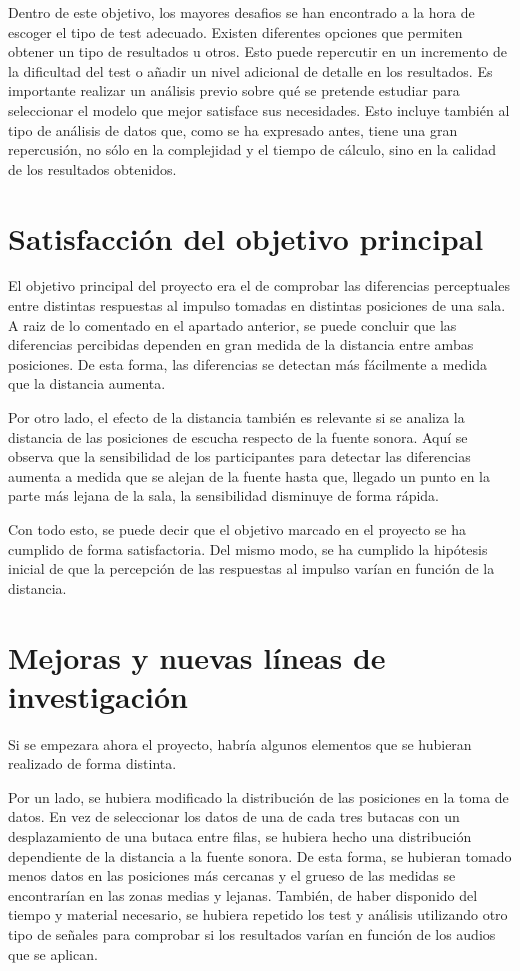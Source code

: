\documentclass[11pt,a4paper,twoside]{book}
\begin{document}
            Dentro de este objetivo, los mayores desafios se han encontrado a la hora de escoger el tipo de test adecuado. Existen diferentes opciones que permiten obtener un tipo de resultados u otros. Esto puede repercutir en un incremento de la dificultad del test o añadir un nivel adicional de detalle en los resultados. Es importante realizar un análisis previo sobre qué se pretende estudiar para seleccionar el modelo que mejor satisface sus necesidades. Esto incluye también al tipo de análisis de datos que, como se ha expresado antes, tiene una gran repercusión, no sólo en la complejidad y el tiempo de cálculo, sino en la calidad de los resultados obtenidos.
    
    \section{Satisfacción del objetivo principal}
        El objetivo principal del proyecto era el de comprobar las diferencias perceptuales entre distintas respuestas al impulso tomadas en distintas posiciones de una sala. A raiz de lo comentado en el apartado anterior, se puede concluir que las diferencias percibidas dependen en gran medida de la distancia entre ambas posiciones. De esta forma, las diferencias se detectan más fácilmente a medida que la distancia aumenta.
        
        Por otro lado, el efecto de la distancia también es relevante si se analiza la distancia de las posiciones de escucha respecto de la fuente sonora. Aquí se observa que la sensibilidad de los participantes para detectar las diferencias aumenta a medida que se alejan de la fuente hasta que, llegado un punto en la parte más lejana de la sala, la sensibilidad disminuye de forma rápida.
        
        Con todo esto, se puede decir que el objetivo marcado en el proyecto se ha cumplido de forma satisfactoria. Del mismo modo, se ha cumplido la hipótesis inicial de que la percepción de las respuestas al impulso varían en función de la distancia.
    
    \section{Mejoras y nuevas líneas de investigación}
    
        Si se empezara ahora el proyecto, habría algunos elementos que se hubieran realizado de forma distinta.
        
        Por un lado, se hubiera modificado la distribución de las posiciones en la toma de datos. En vez de seleccionar los datos de una de cada tres butacas con un desplazamiento de una butaca entre filas, se hubiera hecho una distribución dependiente de la distancia a la fuente sonora. De esta forma, se hubieran tomado menos datos en las posiciones más cercanas y el grueso de las medidas se encontrarían en las zonas medias y lejanas. También, de haber disponido del tiempo y material necesario, se hubiera repetido los test y análisis utilizando otro tipo de señales para comprobar si los resultados varían en función de los audios que se aplican.
    
\end{document}
